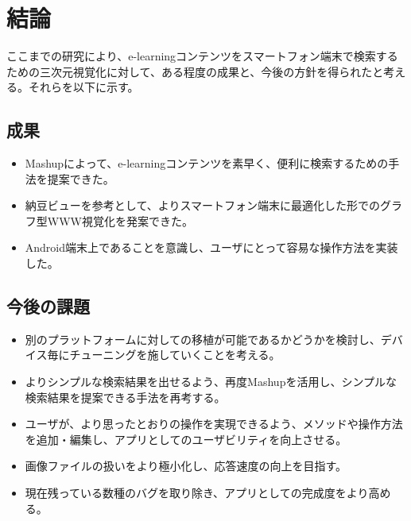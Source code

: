 \chapter{結論}
\label{chap:conclusion}

ここまでの研究により、e-learningコンテンツをスマートフォン端末で検索するための三次元視覚化に対して、ある程度の成果と、今後の方針を得られたと考える。それらを以下に示す。

\section{成果}
\begin{itemize}
\item Mashupによって、e-learningコンテンツを素早く、便利に検索するための手法を提案できた。
\item 納豆ビューを参考として、よりスマートフォン端末に最適化した形でのグラフ型WWW視覚化を発案できた。
\item Android端末上であることを意識し、ユーザにとって容易な操作方法を実装した。
\end{itemize}

\section{今後の課題}
\begin{itemize}
\item 別のプラットフォームに対しての移植が可能であるかどうかを検討し、デバイス毎にチューニングを施していくことを考える。
\item よりシンプルな検索結果を出せるよう、再度Mashupを活用し、シンプルな検索結果を提案できる手法を再考する。
\item ユーザが、より思ったとおりの操作を実現できるよう、メソッドや操作方法を追加・編集し、アプリとしてのユーザビリティを向上させる。
\item 画像ファイルの扱いをより極小化し、応答速度の向上を目指す。
\item 現在残っている数種のバグを取り除き、アプリとしての完成度をより高める。
\end{itemize}